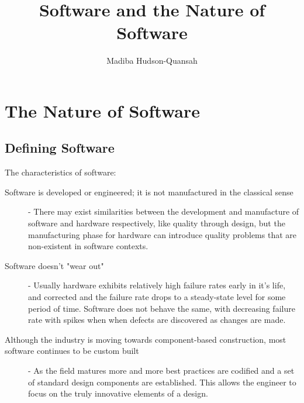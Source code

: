 \documentclass[12pt letter]{report}
\title{\Huge{Software and the Nature of Software}}
\author{\huge{Madiba Hudson-Quansah}}
\date{}
\begin{document}
\maketitle
\newpage
{}
\tableofcontents
\pagebreak

\chapter{The Nature of Software}

\section{Defining Software}


The characteristics of software:
\begin{description}
  \item[Software is developed or engineered; it is not manufactured in the classical sense] - There may exist
        similarities between the development and manufacture of software and hardware respectively, like quality through
        design, but the manufacturing phase for hardware can introduce quality problems that are non-existent in software
        contexts.
  \item[Software doesn't "wear out"] - Usually hardware exhibits relatively high failure rates early in it's life, and
        corrected and the failure rate drops to a steady-state level for some period of time. Software does not behave
        the same, with decreasing failure rate with spikes when when defects are discovered as changes are made.
  \item[Although the industry is moving towards component-based construction, most software continues to be custom built] -
        As the field matures more and more best practices are codified and a set of standard design
        components are established. This allows the engineer to focus on the truly innovative elements of a design.
\end{description}
\end{document}
